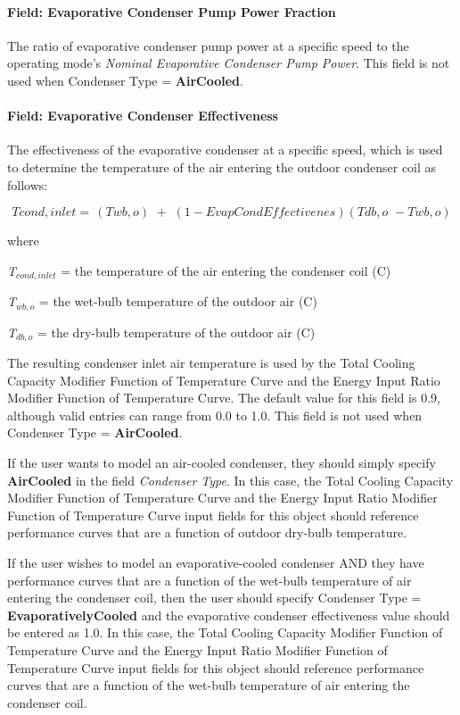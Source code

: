 \paragraph{Field: Evaporative Condenser Pump Power Fraction}\label{field-evaporative-condenser-pump-power-fraction}

The ratio of evaporative condenser pump power at a specific speed to the operating mode's \textit{Nominal Evaporative Condenser Pump Power}. This field is not used when Condenser Type = \textbf{AirCooled}.

\paragraph{Field: Evaporative Condenser Effectiveness}\label{field-evaporative-condenser-effectiveness}

The effectiveness of the evaporative condenser at a specific speed, which is used to determine the temperature of the air entering the outdoor condenser coil as follows:

\begin{equation}
Tcond,inlet = \,\left( {Twb,o} \right)\,\, + \,\,\left( {1 - EvapCondEffectivenes} \right)\left( {Tdb,o\,\, - Twb,o} \right)
\end{equation}

where

\emph{T\(_{cond,inlet}\)} = the temperature of the air entering the condenser coil (C)

\emph{T\(_{wb,o}\)} = the wet-bulb temperature of the outdoor air (C)

\emph{T\(_{db,o}\)} = the dry-bulb temperature of the outdoor air (C)

The resulting condenser inlet air temperature is used by the Total Cooling Capacity Modifier Function of Temperature Curve and the Energy Input Ratio Modifier Function of Temperature Curve. The default value for this field is 0.9, although valid entries can range from 0.0 to 1.0. This field is not used when Condenser Type = \textbf{AirCooled}.

If the user wants to model an air-cooled condenser, they should simply specify \textbf{AirCooled} in the field \textit{Condenser Type}. In this case, the Total Cooling Capacity Modifier Function of Temperature Curve and the Energy Input Ratio Modifier Function of Temperature Curve input fields for this object should reference performance curves that are a function of outdoor dry-bulb temperature.

If the user wishes to model an evaporative-cooled condenser AND they have performance curves that are a function of the wet-bulb temperature of air entering the condenser coil, then the user should specify Condenser Type = \textbf{EvaporativelyCooled} and the evaporative condenser effectiveness value should be entered as 1.0. In this case, the Total Cooling Capacity Modifier Function of Temperature Curve and the Energy Input Ratio Modifier Function of Temperature Curve input fields for this object should reference performance curves that are a function of the wet-bulb temperature of air entering the condenser coil.


